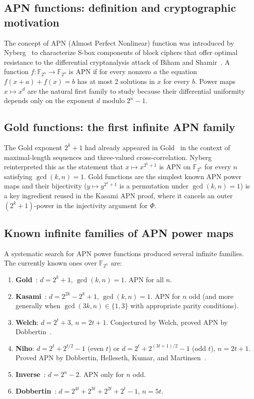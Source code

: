 \documentclass[11pt]{article}
\begin{document}
\subsection{APN functions: definition and cryptographic motivation}
The concept of APN (Almost Perfect Nonlinear) function was introduced by
Nyberg~\cite{Nyberg1994} to characterize S-box components of block ciphers that offer
optimal resistance to the differential cryptanalysis attack of Biham and
Shamir~\cite{BihamShamir1991}. A function $f:\mathbb{F}_{2^n}\to\mathbb{F}_{2^n}$ is APN
if for every nonzero $a$ the equation $f(x+a)+f(x)=b$ has at most 2 solutions in $x$ for
every $b$. Power maps $x\mapsto x^d$ are the natural first family to study because their
differential uniformity depends only on the exponent $d$ modulo $2^n-1$.

\subsection{Gold functions: the first infinite APN family}
The Gold exponent $2^k+1$ had already appeared in Gold~\cite{Gold1968} in the context of
maximal-length sequences and three-valued cross-correlation. Nyberg~\cite{Nyberg1994}
reinterpreted this as the statement that $x\mapsto x^{2^k+1}$ is APN on $\mathbb{F}_{2^n}$
for every $n$ satisfying $\gcd(k,n)=1$. Gold functions are the simplest known APN power
maps and their bijectivity ($y\mapsto y^{2^k+1}$ is a permutation under $\gcd(k,n)=1$) is a
key ingredient reused in the Kasami APN proof, where it cancels an outer $(2^k+1)$-power in
the injectivity argument for $\Phi$.

\subsection{Known infinite families of APN power maps}
A systematic search for APN power functions produced several infinite families. The currently
known ones over $\mathbb{F}_{2^n}$ are:

\begin{enumerate}
  \item \textbf{Gold}~\cite{Gold1968,Nyberg1994}: $d=2^k+1$, $\gcd(k,n)=1$. APN for all $n$.
  \item \textbf{Kasami}~\cite{Kasami1971,JanwaWilson1993}: $d=2^{2k}-2^k+1$, $\gcd(k,n)=1$.
        APN for $n$ odd (and more generally when $\gcd(3k,n)\in\{1,3\}$ with appropriate parity conditions).
  \item \textbf{Welch}: $d=2^t+3$, $n=2t+1$. Conjectured by Welch, proved APN by
        Dobbertin~\cite{Dobbertin1999a}.
  \item \textbf{Niho}: $d=2^t+2^{t/2}-1$ (even $t$) or $d=2^t+2^{(3t+1)/2}-1$ (odd $t$),
        $n=2t+1$. Proved APN by Dobbertin, Helleseth, Kumar, and Martinsen~\cite{DobbertinNiho2001}.
  \item \textbf{Inverse}~\cite{Nyberg1994}: $d=2^n-2$. APN only for $n$ odd.
  \item \textbf{Dobbertin}~\cite{Dobbertin1999b}: $d=2^{4t}+2^{3t}+2^{2t}+2^t-1$, $n=5t$.
\end{enumerate}
\end{document}
